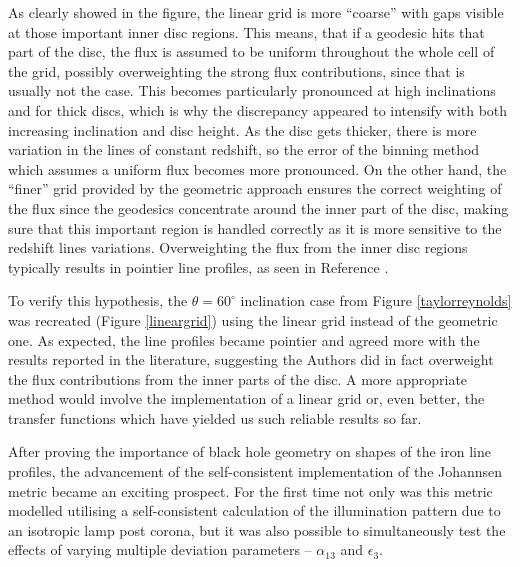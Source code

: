 \documentclass[fleqn,usenatbib,useAMS]{mnras}
\begin{document}
As clearly showed in the figure, the linear grid is more ``coarse'' with gaps visible at those important inner disc regions. This means, that if a geodesic hits that part of the disc, the flux is assumed to be uniform throughout the whole cell of the grid, possibly overweighting the strong flux contributions, since that is usually not the case. This becomes particularly pronounced at high inclinations and for thick discs, which is why the discrepancy appeared to intensify with both increasing inclination and disc height. As the disc gets thicker, there is more variation in the lines of constant redshift, so the error of the binning method which assumes a uniform flux becomes more pronounced. On the other hand, the ``finer'' grid provided by the geometric approach ensures the correct weighting of the flux since the geodesics concentrate around the inner part of the disc, making sure that this important region is handled correctly as it is more sensitive to the redshift lines variations. Overweighting the flux from the inner disc regions typically results in pointier line profiles, as seen in Reference \cite{taylor2018exploring}. 

To verify this hypothesis, the $\theta = 60^{\circ}$ inclination case from Figure \ref{taylorreynolds} was recreated (Figure \ref{lineargrid}) using the linear grid instead of the geometric one. As expected, the line profiles became pointier and agreed more with the results reported in the literature, suggesting the Authors did in fact overweight the flux contributions from the inner parts of the disc. A more appropriate method would involve the implementation of a linear grid or, even better, the transfer functions which have yielded us such reliable results so far.

After proving the importance of black hole geometry on shapes of the iron line profiles, the advancement of the self-consistent implementation of the Johannsen metric became an exciting prospect. For the first time not only was this metric modelled utilising a self-consistent calculation of the illumination pattern due to an isotropic lamp post corona, but it was also possible to simultaneously test the effects of varying multiple deviation parameters -- $\alpha_{13}$ and $\epsilon_{3}$.
\end{document}
